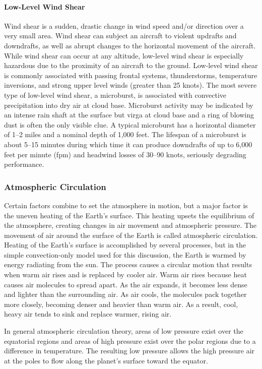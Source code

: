 \documentclass[12pt]{article}
\begin{document}
			\paragraph{Low-Level Wind Shear}
				Wind shear is a sudden, drastic change in wind speed and/or direction over a very small area. Wind shear can subject an aircraft to violent updrafts and downdrafts, as well as abrupt changes to the horizontal movement of the aircraft. While wind shear can occur at any altitude, low-level wind shear is especially hazardous due to the proximity of an aircraft to the ground. Low-level wind shear is commonly associated with passing frontal systems, thunderstorms, temperature inversions, and strong upper level winds (greater than 25 knots).
				The most severe type of low-level wind shear, a microburst, is associated with convective precipitation into dry air at cloud base. Microburst activity may be indicated by an intense rain shaft at the surface but virga at cloud base and a ring of blowing dust is often the only visible clue. A typical microburst has a horizontal diameter of 1–2 miles and a nominal depth of 1,000 feet. The lifespan of a microburst is about 5–15 minutes during which time it can produce downdrafts of up to 6,000 feet per minute (fpm) and headwind losses of 30–90 knots, seriously degrading performance.

		\subsubsection{Atmospheric Circulation}
			Certain factors combine to set the atmosphere in motion, but a major factor is the uneven heating of the Earth’s surface. This heating upsets the equilibrium of the atmosphere, creating changes in air movement and atmospheric pressure. The movement of air around the surface of the Earth is called atmospheric circulation. Heating of the Earth’s surface is accomplished by several processes, but in the simple convection-only model used for this discussion, the Earth is warmed by energy radiating from the sun. The process causes a circular motion that results when warm air rises and is replaced by cooler air. Warm air rises because heat causes air molecules to spread apart. As the air expands, it becomes less dense and lighter than the surrounding air. As air cools, the molecules pack together more closely, becoming denser and heavier than warm air. As a result, cool, heavy air tends to sink and replace warmer, rising air.

			In general atmospheric circulation theory, areas of low pressure exist over the equatorial regions and areas of high pressure exist over the polar regions due to a difference in temperature. The resulting low pressure allows the high pressure air at the poles to flow along the planet’s surface toward the equator. 
\end{document}
